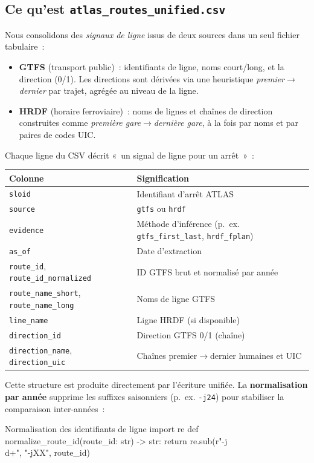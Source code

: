 \subsection{Ce qu'est \texttt{atlas\_routes\_unified.csv}}
Nous consolidons des \emph{signaux de ligne} issus de deux sources dans un seul fichier tabulaire :
\begin{itemize}
  \item \textbf{GTFS} (transport public) : identifiants de ligne, noms court/long, et la direction (0/1). Les directions sont dérivées via une heuristique \emph{premier$\rightarrow$dernier} par trajet, agrégée au niveau de la ligne.
  \item \textbf{HRDF} (horaire ferroviaire) : noms de lignes et chaînes de direction construites comme \emph{première gare$\rightarrow$dernière gare}, à la fois par noms et par paires de codes UIC.
\end{itemize}
Chaque ligne du CSV décrit « un signal de ligne pour un arrêt » :
\begin{center}
\small
\begin{tabular}{l l}
\toprule
Colonne & Signification \\
\midrule
\texttt{sloid} & Identifiant d'arrêt ATLAS\\
\texttt{source} & \texttt{gtfs} ou \texttt{hrdf}\\
\texttt{evidence} & Méthode d'inférence (p. ex. \texttt{gtfs\_first\_last}, \texttt{hrdf\_fplan})\\
\texttt{as\_of} & Date d'extraction\\
\texttt{route\_id}, \texttt{route\_id\_normalized} & ID GTFS brut et normalisé par année\\
\texttt{route\_name\_short}, \texttt{route\_name\_long} & Noms de ligne GTFS\\
\texttt{line\_name} & Ligne HRDF (si disponible)\\
\texttt{direction\_id} & Direction GTFS 0/1 (chaîne)\\
\texttt{direction\_name}, \texttt{direction\_uic} & Chaînes premier$\rightarrow$dernier humaines et UIC\\
\bottomrule
\end{tabular}
\end{center}
Cette structure est produite directement par l'écriture unifiée. La \textbf{normalisation par année} supprime les suffixes saisonniers (p. ex. \texttt{-j24}) pour stabiliser la comparaison inter-années :

\begin{codebox}[language=Python]{Normalisation des identifiants de ligne}
import re
def normalize_route_id(route_id: str) -> str:
    return re.sub(r"-j\\d+", "-jXX", route_id)
\end{codebox}

